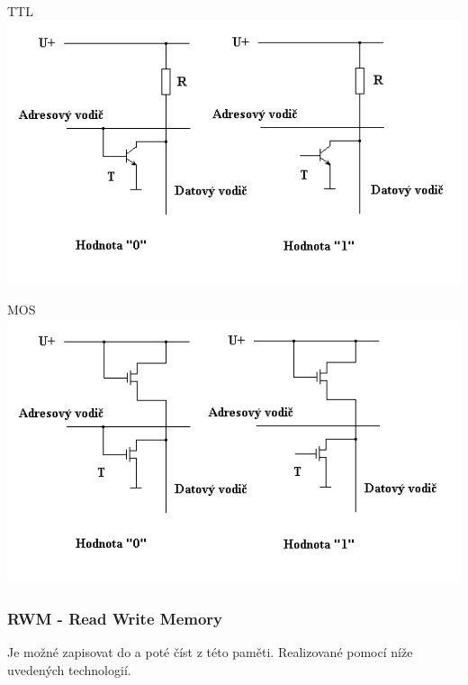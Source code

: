 \begin{multicols}{2}
    \begin{center}
        TTL \\
        \includegraphics[width=1.2\linewidth]{TVY-POS/Polovodicove-pameti/ROMTTL.png}
    \end{center}
    \columnbreak
    \begin{center}
        MOS \\
        \includegraphics[width=1.2\linewidth]{TVY-POS/Polovodicove-pameti/ROMMOS.png}
    \end{center}
\end{multicols}
\subsubsection{RWM - Read Write Memory}
Je možné zapisovat do a poté číst z této paměti.
Realizované pomocí níže uvedených technologií.
\newpage
